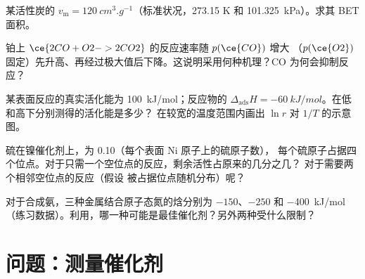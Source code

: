 \begin{exercise}[$\star\star$]\label{exo:b3:surfaces-catalysis:8}
某活性炭的 $v_{\mathrm m} = \qty{120}{cm^3.g^{-1}}$（标准状况，273.15 K 和
\qty{101.325}{kPa}）。求其 BET 面积。
\end{exercise}

\begin{exercise}[$\star\star$]\label{exo:b3:surfaces-catalysis:9}
铂上 $\ce{2 CO + O2 -> 2 CO2}$ 的反应速率随 $p(\ce{CO})$ 增大
（$p(\ce{O2})$ 固定）先升高、再经过极大值后下降。这说明采用何种机理？CO
为何会抑制反应？
\end{exercise}

\begin{exercise}[$\star\star\star$]\label{exo:b3:surfaces-catalysis:10}
某表面反应的真实活化能为 \qty{100}{kJ/mol}；反应物的
$\Delta_{\mathrm{ads}}H = \qty{-60}{kJ/mol}$。在低和高下分别测得的活化能是多少？
在较宽的温度范围内画出 $\ln r$ 对 $1/T$ 的示意图。
\end{exercise}

\begin{exercise}[$\star\star\star$]\label{exo:b3:surfaces-catalysis:11}
硫在镍催化剂上，为 0.10（每个表面 Ni 原子上的硫原子数），
每个硫原子占据四个位点。对于只需一个空位点的反应，剩余活性占原来的几分之几？
对于需要两个相邻空位点的反应（假设
被占据位点随机分布）呢？
\end{exercise}

\begin{exercise}[$\star\star\star$]\label{exo:b3:surfaces-catalysis:12}
对于合成氨，三种金属结合原子态氮的焓分别为
$-150$、$-250$ 和 \qty{-400}{kJ/mol}（练习数据）。利用，哪一种可能是最佳催化剂？另外两种受什么限制？
\end{exercise}

\section{问题：测量催化剂}

